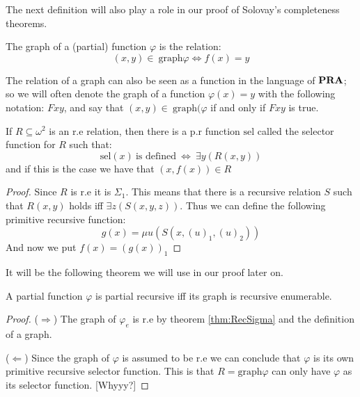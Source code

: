 \documentclass[../main.tex]{subfiles}
\begin{document}
The next definition will also play a role in our proof of Solovay's
completeness theorems.

\begin{defi}
	The graph of a (partial) function $\varphi$ is the relation:
	\[(x,y)\in\ \text{graph} \varphi\Leftrightarrow f(x)=y\]
\end{defi}
The relation of a graph can also be seen as a function in the language of
$\text{\textbf{PRA}}$; so we will often denote the graph of a function $\varphi(x)=y$ with the
following notation: $Fxy$, and say that $(x,y)\in\ \text{graph}(\varphi$ if and
only if $Fxy$ is true.

\begin{thm}
	If $R\subseteq\omega^2$ is an r.e relation, then there is a p.r
	function $\text{sel}$ called the selector function for $R$ such that:
	$$\text{sel}(x)\ \text{is defined}\ \Leftrightarrow\ \exists y(R(x,y))$$
	and if this is the case we have that $(x,f(x))\in R$
\end{thm}
\begin{proof}
	Since $R$ is r.e it is $\Sigma_1$. This means that there is a recursive
	relation $S$ such that $R(x,y)$ holds iff $\exists z (S(x,y,z))$. Thus
	we can define the following primitive recursive function:
	$$g(x)=\mu u(S(x,(u)_1,(u)_2))$$
	And now we put $f(x)=(g(x))_1$
\end{proof}
It will be the following theorem we will use in our proof later on.
\begin{thm}
	A partial function $\varphi$ is partial recursive iff its graph is recursive
	enumerable.
\end{thm}
\begin{proof}
	($\Rightarrow$) The graph of $\varphi_e$ is r.e by theorem \ref{thm:RecSigma} and the
	definition of a graph.

	($\Leftarrow$) Since the graph of $\varphi$ is assumed to be r.e we can
	conclude that $\varphi$ is its own primitive recursive selector function. This
	is that $R=\text{graph} \varphi$ can only have $\varphi$ as its selector function.
	[Whyyy?]
\end{proof}
\end{document}
